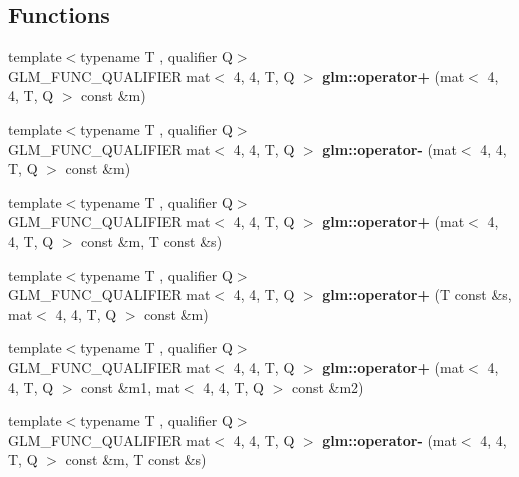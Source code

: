 \subsection*{Functions}
\begin{DoxyCompactItemize}
\item 
\mbox{\label{type__mat4x4_8inl_a03db222d057436a66bdb95bba575ba6b}} 
{\footnotesize template$<$typename T , qualifier Q$>$ }\\G\+L\+M\+\_\+\+F\+U\+N\+C\+\_\+\+Q\+U\+A\+L\+I\+F\+I\+ER mat$<$ 4, 4, T, Q $>$ {\bfseries glm\+::operator+} (mat$<$ 4, 4, T, Q $>$ const \&m)
\item 
\mbox{\label{type__mat4x4_8inl_a5bffee6489f103cf823c19f8e5b09e24}} 
{\footnotesize template$<$typename T , qualifier Q$>$ }\\G\+L\+M\+\_\+\+F\+U\+N\+C\+\_\+\+Q\+U\+A\+L\+I\+F\+I\+ER mat$<$ 4, 4, T, Q $>$ {\bfseries glm\+::operator-\/} (mat$<$ 4, 4, T, Q $>$ const \&m)
\item 
\mbox{\label{type__mat4x4_8inl_ae26a037c7de3f3c22ded5612bc42efa2}} 
{\footnotesize template$<$typename T , qualifier Q$>$ }\\G\+L\+M\+\_\+\+F\+U\+N\+C\+\_\+\+Q\+U\+A\+L\+I\+F\+I\+ER mat$<$ 4, 4, T, Q $>$ {\bfseries glm\+::operator+} (mat$<$ 4, 4, T, Q $>$ const \&m, T const \&s)
\item 
\mbox{\label{type__mat4x4_8inl_aae71418fa4d956737bea9695abd62b7d}} 
{\footnotesize template$<$typename T , qualifier Q$>$ }\\G\+L\+M\+\_\+\+F\+U\+N\+C\+\_\+\+Q\+U\+A\+L\+I\+F\+I\+ER mat$<$ 4, 4, T, Q $>$ {\bfseries glm\+::operator+} (T const \&s, mat$<$ 4, 4, T, Q $>$ const \&m)
\item 
\mbox{\label{type__mat4x4_8inl_a7d22ecd127bca5161a879a9b60edc9d0}} 
{\footnotesize template$<$typename T , qualifier Q$>$ }\\G\+L\+M\+\_\+\+F\+U\+N\+C\+\_\+\+Q\+U\+A\+L\+I\+F\+I\+ER mat$<$ 4, 4, T, Q $>$ {\bfseries glm\+::operator+} (mat$<$ 4, 4, T, Q $>$ const \&m1, mat$<$ 4, 4, T, Q $>$ const \&m2)
\item 
\mbox{\label{type__mat4x4_8inl_a56afe53e1478f62c6cff6b49e8cf8977}} 
{\footnotesize template$<$typename T , qualifier Q$>$ }\\G\+L\+M\+\_\+\+F\+U\+N\+C\+\_\+\+Q\+U\+A\+L\+I\+F\+I\+ER mat$<$ 4, 4, T, Q $>$ {\bfseries glm\+::operator-\/} (mat$<$ 4, 4, T, Q $>$ const \&m, T const \&s)

\end{DoxyCompactItemize}
